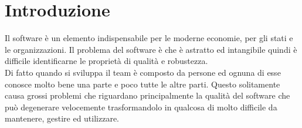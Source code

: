 \section{Introduzione}
\label{sec:01_introduzione}
Il software è un elemento indispensabile per le moderne economie, per gli stati e le organizzazioni.
Il problema del software è che è astratto ed intangibile quindi è difficile identificarne le proprietà di qualità e robustezza.\\
Di fatto quando si sviluppa il team è composto da persone ed ognuna di esse conosce molto bene una parte e poco tutte le altre parti.
Questo solitamente causa grossi problemi che riguardano principalmente la qualità del software che può degenerare velocemente trasformandolo in qualcosa di molto difficile da mantenere, gestire ed utilizzare.

